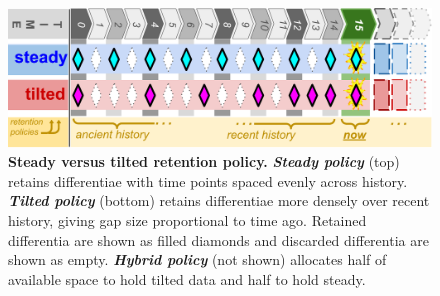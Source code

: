 \begin{figure}
  \centering
  \includegraphics[width=\linewidth]{img/steady-vs-tilted-schematic}
  \caption{%
  \textbf{Steady versus tilted retention policy.}
  \footnotesize
  \textbf{\textit{Steady policy}} (top) retains differentiae with time points spaced evenly across history.
  \textbf{\textit{Tilted policy}} (bottom) retains differentiae more densely over recent history, giving gap size proportional to time ago.
  Retained differentia are shown as filled diamonds and discarded differentia are shown as empty.
  \textbf{\textit{Hybrid policy}} (not shown) allocates half of available space to hold tilted data and half to hold steady.
  }
  \label{fig:steady-vs-tilted-schematic}
\end{figure}
